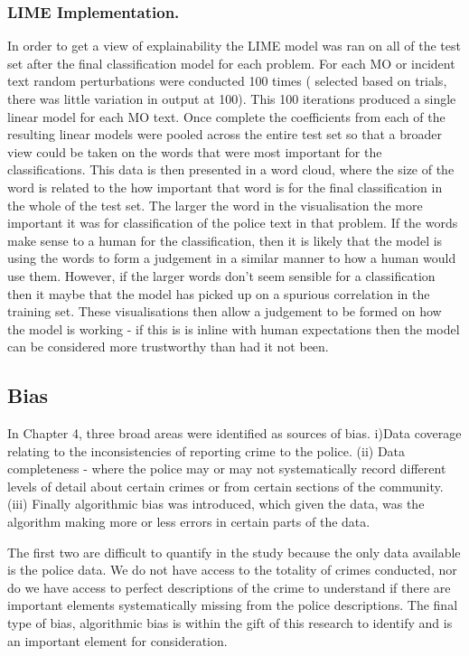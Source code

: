 \subsubsection{LIME Implementation.} In order to get a view of explainability the LIME model was ran on all of the test set after the final classification model for each problem. For each MO or incident text random perturbations were conducted 100 times ( selected based on trials, there was little variation in output at 100). This 100 iterations produced a single linear model for each MO text. Once complete the coefficients from each of the resulting linear models were pooled across the entire test set so that a broader view could be taken on the words that were most important for the classifications. This data is then presented in a word cloud, where the size of the word is related to the how important that word is for the final classification in the whole of the test set. The larger the word in the visualisation the more important it was for classification of the police text in that problem. If the words make sense to a human for the classification, then it is likely that the model is using the words to form a judgement in a similar manner to how a human would use them. However, if the larger words don't seem sensible for a classification then it maybe that the model has picked up on a spurious correlation in the training set. These visualisations then allow a judgement to be formed on how the model is working - if this is is inline with human expectations then the model can be considered more trustworthy than had it not been. 

\subsection{Bias}In Chapter 4, three broad areas were identified as sources of bias. i)Data coverage relating to the inconsistencies of reporting crime to the police. (ii) Data completeness - where the police may or may not systematically record different levels of detail about certain crimes or from certain sections of the community. (iii) Finally algorithmic bias was introduced, which given the data, was the algorithm making more or less errors in certain parts of the data. 

The first two are difficult to quantify in the study because the only data available is the police data. We do not have access to the totality of crimes conducted, nor do we have access to perfect descriptions of the crime to understand if there are important elements systematically missing from the police descriptions. The final type of bias, algorithmic bias is within the gift of this research to identify and is an important element for consideration. 

